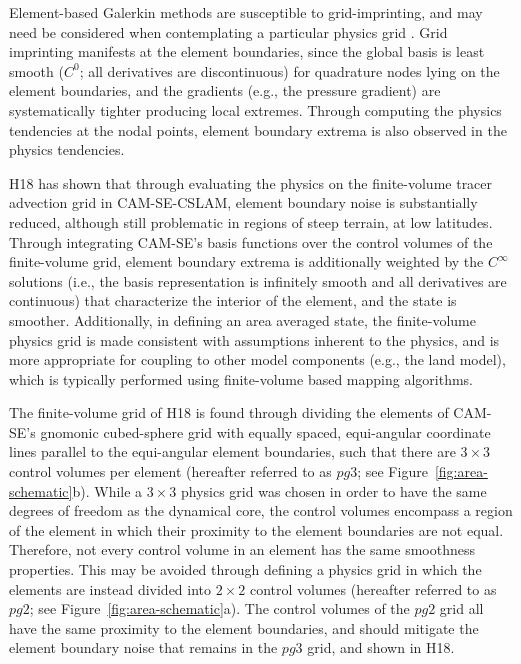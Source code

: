 \documentclass{agujournal}
\begin{document}
Element-based Galerkin methods are susceptible to grid-imprinting, and may need be considered when contemplating a particular physics grid \citep[][hereafter referred to as H18]{HL2018MWR}. Grid imprinting manifests at the element boundaries, since the global basis is least smooth ($C^{0}$; all derivatives are discontinuous) for quadrature nodes lying on the element boundaries, and the gradients (e.g., the pressure gradient) are systematically tighter producing local extremes. Through computing the physics tendencies at the nodal points, element boundary extrema is also observed in the physics tendencies. 

H18 has shown that through evaluating the physics on the finite-volume tracer advection grid in CAM-SE-CSLAM, element boundary noise is substantially reduced, although still problematic in regions of steep terrain, at low latitudes. Through integrating CAM-SE's basis functions over the control volumes of the finite-volume grid, element boundary extrema is additionally weighted by the $C^{\infty}$ solutions (i.e., the basis representation is infinitely smooth and all derivatives are continuous) that characterize the interior of the element, and the state is smoother. Additionally, in defining an area averaged state, the finite-volume physics grid is made consistent with assumptions inherent to the physics, and is more appropriate for coupling to other model components (e.g., the land model), which is typically performed using finite-volume based mapping algorithms.

The finite-volume grid of H18 is found through dividing the elements of CAM-SE's gnomonic cubed-sphere grid with equally spaced, equi-angular coordinate lines parallel to the equi-angular element boundaries, such that there are $3\times 3$ control volumes per element (hereafter referred to as $pg3$; see Figure~\ref{fig:area-schematic}b). While a $3\times 3$ physics grid was chosen in order to have the same degrees of freedom as the dynamical core, the control volumes encompass a region of the element in which their proximity to the element boundaries are not equal. Therefore, not every control volume in an element has the same smoothness properties. This may be avoided through defining a physics grid in which the elements are instead divided into $2\times 2$ control volumes (hereafter referred to as $pg2$; see Figure~\ref{fig:area-schematic}a). The control volumes of the $pg2$ grid all have the same proximity to the element boundaries, and should mitigate the element boundary noise that remains in the $pg3$ grid, and shown in H18.
\end{document}
